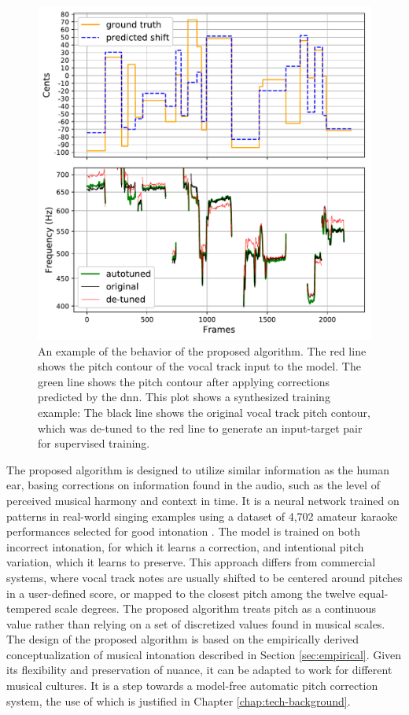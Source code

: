 \begin{figure}[t!]
    \centering
    \includegraphics[width=\columnwidth]{figures/results.pdf}
    \caption{An example of the behavior of the proposed algorithm. The red line shows the pitch contour of the vocal track input to the model. The green line shows the pitch contour after applying corrections predicted by the \gls{dnn}. This plot shows a synthesized training example: The black line shows the original vocal track pitch contour, which was de-tuned to the red line to generate an input-target pair for supervised training.}
    \label{fig:results}
\end{figure}

The proposed algorithm is designed to utilize similar information as the human ear, basing corrections on information found in the audio, such as the level of perceived musical harmony and context in time. It is a neural network trained on patterns in real-world singing examples using a dataset of 4,702 amateur karaoke performances selected for good intonation \cite{wager2018intonation}. The model is trained on both incorrect intonation, for which it learns a correction, and intentional pitch variation, which it learns to preserve. This approach differs from commercial systems, where vocal track notes are usually shifted to be centered around pitches in a user-defined score, or mapped to the closest pitch among the twelve equal-tempered scale degrees. The proposed algorithm treats pitch as a continuous value rather than relying on a set of discretized values found in musical scales. The design of the proposed algorithm is based on the empirically derived conceptualization of musical intonation described in Section \ref{sec:empirical}. Given its flexibility and preservation of nuance, it can be adapted to work for different musical cultures. It is a step towards a model-free automatic pitch correction system, the use of which is justified in Chapter \ref{chap:tech-background}. 

